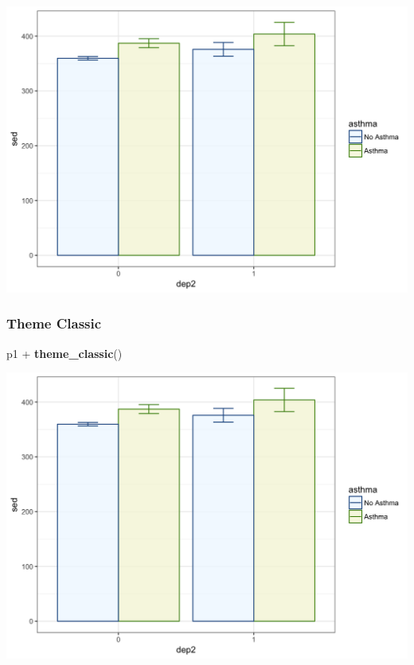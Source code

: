 \documentclass[]{tufte-book}
\newenvironment{Shaded}{}{}
\newcommand{\KeywordTok}[1]{\textcolor[rgb]{0.00,0.44,0.13}{\textbf{#1}}}
\newcommand{\StringTok}[1]{\textcolor[rgb]{0.25,0.44,0.63}{#1}}
\newcommand{\OperatorTok}[1]{\textcolor[rgb]{0.40,0.40,0.40}{#1}}
\newcommand{\NormalTok}[1]{#1}
\theoremstyle{definition}
\theoremstyle{definition}
\theoremstyle{remark}
\begin{document}
\includegraphics{_main_files/figure-latex/unnamed-chunk-146-1}

\subsubsection*{Theme Classic}\label{theme-classic}

\begin{Shaded}
\begin{Highlighting}[]
\NormalTok{p1 }\OperatorTok{+}\StringTok{ }\KeywordTok{theme_classic}\NormalTok{()}
\end{Highlighting}
\end{Shaded}

\includegraphics{_main_files/figure-latex/unnamed-chunk-147-1}
\end{document}

